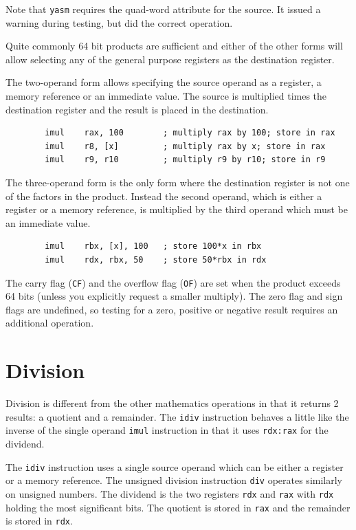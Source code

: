 \documentclass[11pt,b5paper]{book}
\begin{document}
Note that {\tt yasm} requires the quad-word attribute for the source.
It issued a warning during testing, but did the correct operation.

Quite commonly 64 bit products are sufficient and either of the other forms will
allow selecting any of the general purpose registers as the destination
register.

The two-operand form allows specifying the source operand as a register, a
memory reference or an immediate value.  The source is multiplied times the
destination register and the result is placed in the destination.

\begin{verbatim}
        imul    rax, 100        ; multiply rax by 100; store in rax
        imul    r8, [x]         ; multiply rax by x; store in rax
        imul    r9, r10         ; multiply r9 by r10; store in r9
\end{verbatim}

The three-operand form is the only form where the destination register is not
one of the factors in the product.
Instead the second operand, which is either a register or a memory reference,
is multiplied by the third operand which must be an immediate value.

\begin{verbatim}
        imul    rbx, [x], 100   ; store 100*x in rbx
        imul    rdx, rbx, 50    ; store 50*rbx in rdx
\end{verbatim}

The carry flag ({\tt CF}) and the overflow flag ({\tt OF}) are set when the  
product exceeds 64 bits (unless you explicitly request a smaller multiply).
The zero flag and sign flags are undefined, so testing for a zero, positive  
or negative result requires an additional operation.



\section{Division}

Division is different from the other mathematics operations in that it returns  
2 results: a quotient and a remainder.
The {\tt idiv} instruction behaves a little like the inverse of the single
operand {\tt imul} instruction in that it uses {\tt rdx:rax} for the dividend.

The {\tt idiv} instruction uses a single source operand which can be 
either a register or a memory reference.
The unsigned division instruction {\tt div} operates similarly on unsigned
numbers.
The dividend is the two registers {\tt rdx} and {\tt rax} with {\tt rdx}
holding the most significant bits.
The quotient is stored in {\tt rax} and the remainder is stored in {\tt rdx}.
\end{document}
